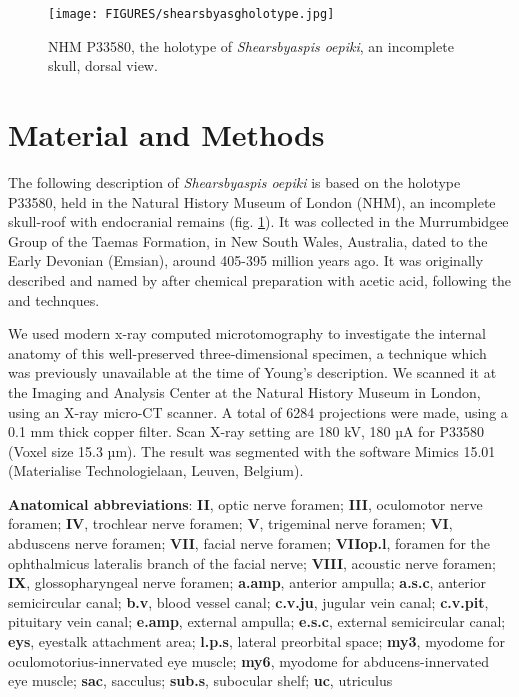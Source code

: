 \documentclass[11pt,letterpaper]{report}
\begin{document}
\begin{figure}[!h]
\centering
    \texttt{[image: FIGURES/shearsbyasgholotype.jpg]}
\caption{\footnotesize{NHM P33580, the holotype of \textit{Shearsbyaspis oepiki}, an incomplete skull, dorsal view.}}
\label{shearsbyholo}
\end{figure}

\section{Material and Methods}

The following description of \textit{Shearsbyaspis oepiki} \citealt{Young1985} is based on the holotype P33580, held in the Natural History Museum of London (NHM), an incomplete skull-roof with endocranial remains (fig. \ref{shearsbyholo}). It was collected in the Murrumbidgee Group of the Taemas Formation, in New South Wales, Australia, dated to the Early Devonian (Emsian), around 405-395 million years ago. It was originally described and named by \cite{Young1985} after chemical preparation with acetic acid, following the \cite{Toombs1948} and \cite{Toombs1959} technques. 

We used modern x-ray computed microtomography to investigate the internal anatomy of this well-preserved three-dimensional specimen, a technique which was previously unavailable at the time of Young’s description. We scanned it at the Imaging and Analysis Center at the Natural History Museum in London, using an X-ray micro-CT scanner. A total of 6284 projections were made, using a 0.1 mm thick copper filter. Scan X-ray setting are 180 kV, 180 µA for P33580 (Voxel size 15.3 µm). The result was segmented with the software Mimics 15.01 (Materialise Technologielaan, Leuven, Belgium).

\textbf{Anatomical abbreviations}: \textbf{II}, optic nerve foramen; \textbf{III}, oculomotor nerve foramen; \textbf{IV}, trochlear nerve foramen; \textbf{V}, trigeminal nerve foramen; \textbf{VI}, abduscens nerve foramen; \textbf{VII}, facial nerve foramen; \textbf{VIIop.l}, foramen for the ophthalmicus lateralis branch of the facial nerve; \textbf{VIII}, acoustic nerve foramen; \textbf{IX}, glossopharyngeal nerve foramen; \textbf{a.amp}, anterior ampulla; \textbf{a.s.c}, anterior semicircular canal; \textbf{b.v}, blood vessel canal; \textbf{c.v.ju}, jugular vein canal; \textbf{c.v.pit}, pituitary vein canal; \textbf{e.amp}, external ampulla; \textbf{e.s.c}, external semicircular canal; \textbf{eys}, eyestalk attachment area; \textbf{l.p.s}, lateral preorbital space; \textbf{my3}, myodome for oculomotorius-innervated eye muscle; \textbf{my6}, myodome for abducens-innervated eye muscle; \textbf{sac}, sacculus; \textbf{sub.s}, subocular shelf; \textbf{uc}, utriculus  
\end{document}
